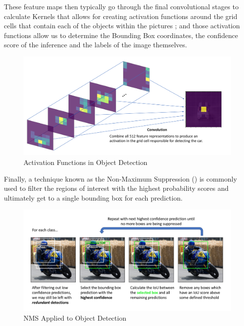 \documentclass[openright]{normas-utf-tex} %
\begin{document}
These feature maps then typically go through the final convolutional stages to
calculate Kernels that allows for creating activation functions around the grid
cells that contain each of the objects within the pictures \cite{JeremyJordan};
and those activation functions allow us to determine the Bounding Box
coordinates, the confidence score of the inference and the labels of the image
themselves. 

\begin{figure}[H]
	\centering
	\includegraphics[width=1\textwidth]{./images/convolution-activation.png}
	\caption[Activation Functions in Object Detection]{Activation Functions in Object Detection}
	\label{fig:convolutionActivation}
\end{figure}

Finally, a technique known as the Non-Maximum Suppression
() is commonly used to filter the regions
of interest with the highest probability scores and ultimately get to a single
bounding box for each prediction.

\begin{figure}[H]
	\centering
	\includegraphics[width=1\textwidth]{./images/nms-object-detection.png }
	\caption[NMS Applied to Object Detection]{NMS Applied to Object Detection}
	\label{fig:nmsObjectDetection}
\end{figure}
\end{document}
